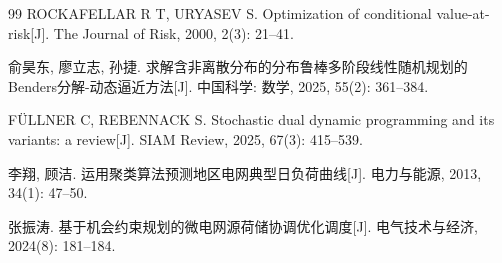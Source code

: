 \begin{thebibliography}{99}
  ROCKAFELLAR R T, URYASEV S.
  Optimization of conditional value-at-risk[J].
  The Journal of Risk, 2000, 2(3): 21--41.

  俞昊东, 廖立志, 孙捷.
  求解含非离散分布的分布鲁棒多阶段线性随机规划的Benders分解-动态逼近方法[J].
  中国科学: 数学, 2025, 55(2): 361--384.

  FÜLLNER C, REBENNACK S.
  Stochastic dual dynamic programming and its variants: a review[J].
  SIAM Review, 2025, 67(3): 415--539.

  李翔, 顾洁.
  运用聚类算法预测地区电网典型日负荷曲线[J].
  电力与能源, 2013, 34(1): 47--50.

  张振涛.
  基于机会约束规划的微电网源荷储协调优化调度[J].
  电气技术与经济, 2024(8): 181--184.

\end{thebibliography}

